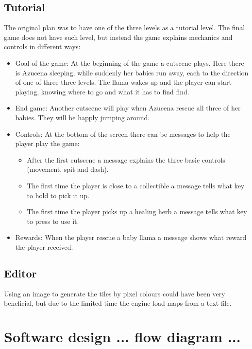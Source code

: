 \documentclass[10pt, a4paper]{article}
\begin{document}
    \subsection{Tutorial}
    The original plan was to have one of the three levels as a tutorial level. The final game does not have such level, but instead the game explains mechanics and controls in different ways:
    \begin{itemize}
    	\item Goal of the game: At the beginning of the game a cutscene plays. Here there is Azucena sleeping, while suddenly her babies run away, each to the direction of one of three three levels. The llama wakes up and the player can start playing, knowing where to go and what it has to find find.
    	\item End game: Another cutscene will play when Azucena rescue all three of her babies. They will be happly jumping around. 
    	\item Controls: At the bottom of the screen there can be messages to help the player play the game:
    	\begin{itemize}
    		\item After the first cutscene a message explains the three basic controls (movement, spit and dash).
    		\item The first time the player is close to a collectible a message tells what key to hold to pick it up.
    		\item The first time the player picks up a healing herb a message tells what key to press to use it.
    	\end{itemize}
    	\item Rewards: When the player rescue a baby llama a message shows what reward the player received.
    \end{itemize}
    
    \subsection{Editor}
    Using an image to generate the tiles by pixel colours could have been very beneficial, but due to the limited time the engine load maps from a text file.
    
    \section{Software design ... flow diagram ...}
    
\end{document}
